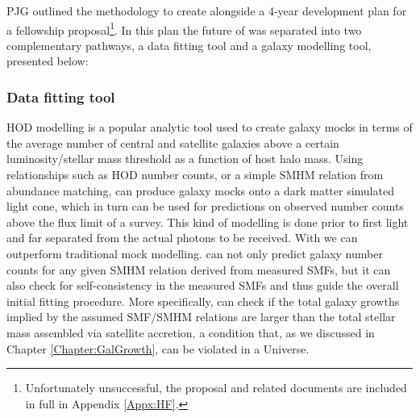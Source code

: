 PJG outlined the methodology to create \steel alongside a 4-year development plan for a fellowship proposal\footnote{Unfortunately unsuccessful, the proposal and related documents are included in full in Appendix \ref{Appx:HF}.}. In this plan the future of \steel was separated into two complementary pathways, a data fitting tool and a galaxy modelling tool, presented below:

\subsubsection{Data fitting tool}

HOD modelling is a popular analytic tool used to create galaxy mocks in terms of the average number of central and satellite galaxies above a certain luminosity/stellar mass threshold as a function of host halo mass. Using relationships such as HOD number counts, or a simple SMHM relation from abundance matching, can produce galaxy mocks onto a dark matter simulated light cone, which in turn can be used for predictions on observed number counts above the flux limit of a survey. This kind of modelling is done prior to first light and far separated from the actual photons to be received. With \steel we can outperform traditional mock modelling. \steel can not only predict galaxy number counts for any given SMHM relation derived from measured SMFs, but it can also check for self-consistency in the measured SMFs and thus guide the overall initial fitting procedure. More specifically, \steel can check if the total galaxy growths implied by the assumed SMF/SMHM relations are larger than the total stellar mass assembled via satellite accretion, a condition that, as we discussed in Chapter \ref{Chapter:GalGrowth}, can be violated in a \LCDM Universe.

